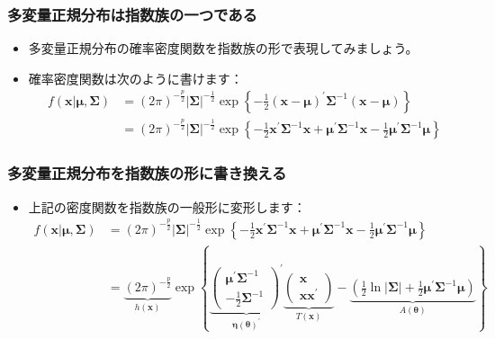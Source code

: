 \documentclass[aspectratio=169]{beamer}
\begin{document}
\begin{frame}
\frametitle{多変量正規分布は指数族の一つである}
\begin{itemize}
    \item 多変量正規分布の確率密度関数を指数族の形で表現してみましょう。
    \item 確率密度関数は次のように書けます：
    \begin{align*}
    f(\bm{x}|\bm{\mu},\bm{\Sigma}) &= (2\pi)^{-\frac{p}{2}}|\bm{\Sigma}|^{-\frac{1}{2}}\exp\left\{-\frac{1}{2}(\bm{x}-\bm{\mu})^{\prime}\bm{\Sigma}^{-1}(\bm{x}-\bm{\mu})\right\} \\
    &= (2\pi)^{-\frac{p}{2}}|\bm{\Sigma}|^{-\frac{1}{2}}\exp\left\{-\frac{1}{2}\bm{x}^{\prime}\bm{\Sigma}^{-1}\bm{x}+\bm{\mu}^{\prime}\bm{\Sigma}^{-1}\bm{x}-\frac{1}{2}\bm{\mu}^{\prime}\bm{\Sigma}^{-1}\bm{\mu}\right\}
    \end{align*}
\end{itemize}
\end{frame}

\begin{frame}
\frametitle{多変量正規分布を指数族の形に書き換える}
\begin{itemize}
    \item 上記の密度関数を指数族の一般形に変形します：
    \begin{align*}
    f(\bm{x}|\bm{\mu},\bm{\Sigma}) &= (2\pi)^{-\frac{p}{2}}|\bm{\Sigma}|^{-\frac{1}{2}}\exp\left\{-\frac{1}{2}\bm{x}^{\prime}\bm{\Sigma}^{-1}\bm{x}+\bm{\mu}^{\prime}\bm{\Sigma}^{-1}\bm{x}-\frac{1}{2}\bm{\mu}^{\prime}\bm{\Sigma}^{-1}\bm{\mu}\right\} \\
    &= \underbrace{(2\pi)^{-\frac{p}{2}}}_{h(\bm{x})}\exp\left\{\underbrace{\begin{pmatrix}\bm{\mu}^{\prime}\bm{\Sigma}^{-1} \\ -\frac{1}{2}\bm{\Sigma}^{-1}\end{pmatrix}^{\prime}}_{\bm{\eta}(\bm{\theta})^{\prime}}\underbrace{\begin{pmatrix}\bm{x} \\ \bm{x}\bm{x}^{\prime}\end{pmatrix}}_{T(\bm{x})}-\underbrace{\left(\frac{1}{2}\ln|\bm{\Sigma}|+\frac{1}{2}\bm{\mu}^{\prime}\bm{\Sigma}^{-1}\bm{\mu}\right)}_{A(\bm{\theta})}\right\}
    \end{align*}
\end{itemize}
\end{frame}
\end{document}
